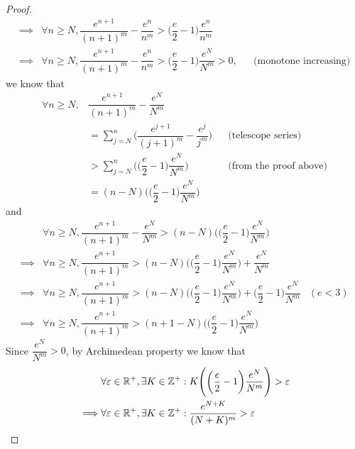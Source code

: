 \begin{proof}
\begin{align*}
    \implies & \forall n \geq N, \dfrac{e^{n + 1}}{(n + 1)^m} - \dfrac{e^n}{n^m} > \bigg(\dfrac{e}{2} - 1\bigg) \dfrac{e^n}{n^m}                                        \\
    \implies & \forall n \geq N, \dfrac{e^{n + 1}}{(n + 1)^m} - \dfrac{e^n}{n^m} > \bigg(\dfrac{e}{2} - 1\bigg) \dfrac{e^N}{N^m} > 0, &  & \text{(monotone increasing)}
  \end{align*}
  we know that
  \begin{align*}
    \forall n \geq N, & \dfrac{e^{n + 1}}{(n + 1)^m} - \dfrac{e^N}{N^m}                                                                 \\
                      & = \sum_{j = N}^n \bigg(\dfrac{e^{j + 1}}{(j + 1)^m} - \dfrac{e^j}{j^m}\bigg) &  & \text{(telescope series)}     \\
                      & > \sum_{j = N}^n \Bigg(\bigg(\dfrac{e}{2} - 1\bigg) \dfrac{e^N}{N^m}\Bigg)   &  & \text{(from the proof above)} \\
                      & = (n - N) \Bigg(\bigg(\dfrac{e}{2} - 1\bigg) \dfrac{e^N}{N^m}\Bigg)
  \end{align*}
  and
  \begin{align*}
             & \forall n \geq N, \dfrac{e^{n + 1}}{(n + 1)^m} - \dfrac{e^N}{N^m} > (n - N) \Bigg(\bigg(\dfrac{e}{2} - 1\bigg) \dfrac{e^N}{N^m}\Bigg)                                        \\
    \implies & \forall n \geq N, \dfrac{e^{n + 1}}{(n + 1)^m} > (n - N) \Bigg(\bigg(\dfrac{e}{2} - 1\bigg) \dfrac{e^N}{N^m}\Bigg) + \dfrac{e^N}{N^m}                                        \\
    \implies & \forall n \geq N, \dfrac{e^{n + 1}}{(n + 1)^m} > (n - N) \Bigg(\bigg(\dfrac{e}{2} - 1\bigg) \dfrac{e^N}{N^m}\Bigg) + \bigg(\dfrac{e}{2} - 1\bigg) \dfrac{e^N}{N^m} & (e < 3) \\
    \implies & \forall n \geq N, \dfrac{e^{n + 1}}{(n + 1)^m} > (n + 1 - N) \Bigg(\bigg(\dfrac{e}{2} - 1\bigg) \dfrac{e^N}{N^m}\Bigg)
  \end{align*}
  Since \(\dfrac{e^N}{N^m} > 0\), by Archimedean property we know that
  \begin{align*}
             & \forall \varepsilon \in \R^+, \exists K \in \Z^+ : K \Bigg(\bigg(\dfrac{e}{2} - 1\bigg) \dfrac{e^N}{N^m}\Bigg) > \varepsilon                                   \\
    \implies & \forall \varepsilon \in \R^+, \exists K \in \Z^+ : \dfrac{e^{N + K}}{(N + K)^m} > \varepsilon                                                                  \\

\end{align*}
\end{proof}
